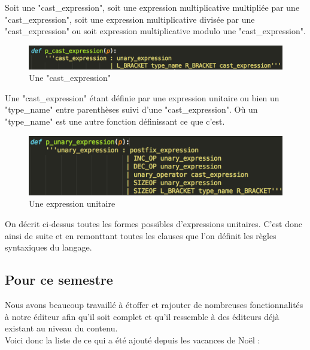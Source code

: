 \documentclass[a4paper,12pt]{article}
\begin{document}
		Soit une "cast\_expression", soit une expression multiplicative multipliée par une "cast\_expression", soit une expression multiplicative divisée par une "cast\_expression" ou soit expression multiplicative modulo une "cast\_expression".
		
		\begin{figure}[!h]
			\begin{center}
				\includegraphics[scale=0.7]{images/yacc2}
				\caption{Une "cast\_expression"}
			\end{center}
		\end{figure}
		
		Une "cast\_expression" étant définie par une expression unitaire ou bien un "type\_name" entre parenthèses suivi d'une "cast\_expression". Où un "type\_name" est une autre fonction définissant ce que c'est.
		
		\begin{figure}[!h]
			\begin{center}
				\includegraphics[scale=0.7]{images/yacc3}
				\caption{Une expression unitaire}
			\end{center}
		\end{figure}
		
		On décrit ci-dessus toutes les formes possibles d'expressions unitaires. C'est donc ainsi de suite et en remonttant toutes les clauses que l'on définit les règles syntaxiques du langage.
		
	\subsection{Pour ce semestre}
	
		Nous avons beaucoup travaillé à étoffer et rajouter de nombreuses fonctionnalités à notre éditeur afin qu'il soit complet et qu'il ressemble à des éditeurs déjà existant au niveau du contenu.\\
		
		Voici donc la liste de ce qui a été ajouté depuis les vacances de Noël :
		
\end{document}
